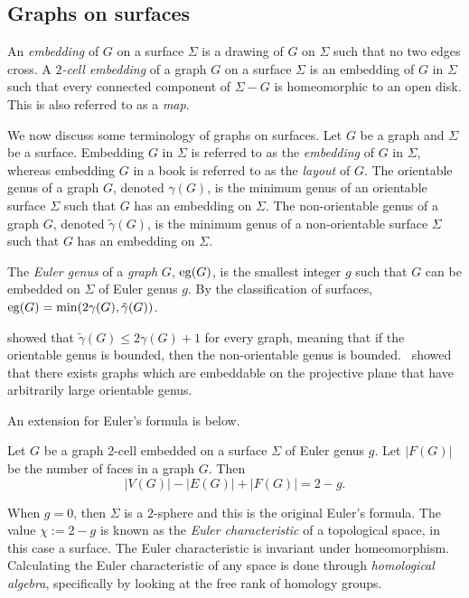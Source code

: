 \subsection{Graphs on surfaces}

An \textit{embedding} of $G$ on a surface $\Sigma$ is a drawing of $G$ on $\Sigma$ such that no two edges cross. 
A \textit{$2$-cell embedding} of a graph $G$ on a surface $\Sigma$ is an embedding of $G$ in $\Sigma$ such that every connected component of $\Sigma - G$ is homeomorphic to an open disk. This is also referred to as a \textit{map}.

We now discuss some terminology of graphs on surfaces. Let $G$ be a graph and $\Sigma$ be a surface. Embedding $G$ in $\Sigma$ is referred to as the \textit{embedding} of $G$ in $\Sigma$, whereas embedding $G$ in a book is referred to as the \textit{layout} of $G$. The orientable genus of a graph \(G\), denoted \(\gamma(G)\), is the minimum genus of an orientable surface $\Sigma$ such that $G$ has an embedding on $\Sigma$. The non-orientable genus of a graph \(G\), denoted \(\tilde{\gamma}(G)\), is the minimum genus of a non-orientable surface $\Sigma$ such that $G$ has an embedding on $\Sigma$. 

The \textit{Euler genus} of a \textit{graph} \(G\), $\operatorname{eg}(G)$, is the smallest integer \(g\) such that \(G\) can be embedded on $\Sigma$ of Euler genus $g$. By the classification of surfaces, $\operatorname{eg}(G) = \min(2 \gamma(G), \tilde{\gamma}(G))$. 

\textcite{moharOrientableGenusGraphs1998} showed that \(\tilde{\gamma}(G) \leq 2 \gamma(G) + 1\) for every graph, meaning that if the orientable genus is bounded, then the non-orientable genus is bounded.\ \textcite{auslanderImbeddingGraphsManifolds1963} showed that there exists graphs which are embeddable on the projective plane that have arbitrarily large orientable genus. 

An extension for Euler's formula is below. 

\begin{theorem}
	Let $G$ be a graph $2$-cell embedded on a surface $\Sigma$ of Euler genus $g$. Let \(|F(G)|\) be the number of faces in a graph \(G\). Then \[|V(G)| - |E(G)| + |F(G)| = 2 - g.\] 
\end{theorem}

When $g = 0$, then $\Sigma$ is a $2$-sphere and this is the original Euler's formula. 
The value $\chi := 2-g$ is known as the \textit{Euler characteristic} of a topological space, in this case a surface. The Euler characteristic is invariant under homeomorphism. Calculating the Euler characteristic of any space is done through \textit{homological algebra}, specifically by looking at the free rank of homology groups. 

